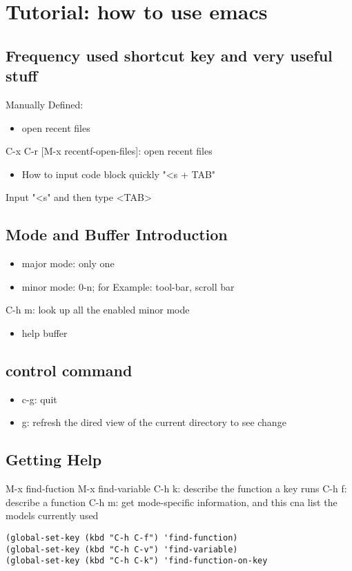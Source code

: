 \documentclass[11pt]{article}
\author{yubao}
\date{\today}
\title{}
\begin{document}
\tableofcontents

\section{Tutorial: how to use emacs}
\label{sec:orgb93ef2e}
\subsection{Frequency used shortcut key and very useful stuff}
\label{sec:org8567fcb}
Manually Defined:
\begin{itemize}
\item open recent files
\end{itemize}
C-x C-r [M-x recentf-open-files]: open recent files
\begin{itemize}
\item How to input code block quickly "<s + TAB"
\end{itemize}
Input "<s" and then type <TAB>
\subsection{Mode and Buffer Introduction}
\label{sec:orge18ab9f}
\begin{itemize}
\item major mode: only one
\item minor mode: 0-n; for Example: tool-bar, scroll bar
\end{itemize}

C-h m: look up all the enabled minor mode
\begin{itemize}
\item help buffer
\end{itemize}
\subsection{control command}
\label{sec:org0bab889}
\begin{itemize}
\item c-g: quit
\item g: refresh the dired view of the current directory to see change
\end{itemize}

\subsection{Getting Help}
\label{sec:org98903d2}
M-x find-fuction
M-x find-variable
C-h k: describe the function a key runs
C-h f: describe a function
C-h m: get mode-specific information, and this cna list the models currently used
\begin{verbatim}
(global-set-key (kbd "C-h C-f") 'find-function)
(global-set-key (kbd "C-h C-v") 'find-variable)
(global-set-key (kbd "C-h C-k") 'find-function-on-key
\end{verbatim}
\end{document}
